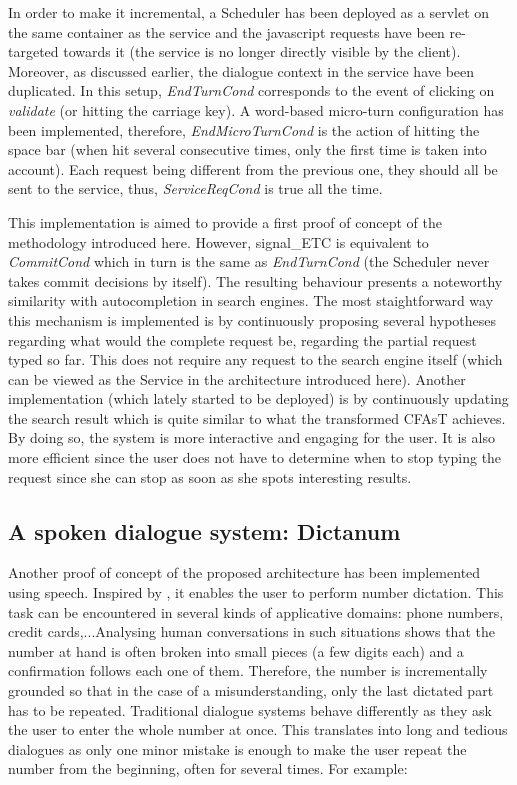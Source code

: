         In order to make it incremental, a Scheduler has been deployed as a servlet on the same container as the service and the javascript requests have been re-targeted towards it (the service is no longer directly visible by the client). Moreover, as discussed earlier, the dialogue context in the service have been duplicated. In this setup, \textit{EndTurnCond} corresponds to the event of clicking on \textit{validate} (or hitting the carriage key). A word-based micro-turn configuration has been implemented, therefore, \textit{EndMicroTurnCond} is the action of hitting the space bar (when hit several consecutive times, only the first time is taken into account). Each request being different from the previous one, they should all be sent to the service, thus, \textit{ServiceReqCond} is true all the time.
        
        This implementation is aimed to provide a first proof of concept of the methodology introduced here. However, signal\_ETC is equivalent to \textit{CommitCond} which in turn is the same as \textit{EndTurnCond} (the Scheduler never takes commit decisions by itself). The resulting behaviour presents a noteworthy similarity with autocompletion in search engines. The most staightforward way this mechanism is implemented is by continuously proposing several hypotheses regarding what would the complete request be, regarding the partial request typed so far. This does not require any request to the search engine itself (which can be viewed as the Service in the architecture introduced here). Another implementation (which lately started to be deployed) is by continuously updating the search result which is quite similar to what the transformed CFAsT achieves. By doing so, the system is more interactive and engaging for the user. It is also more efficient since the user does not have to determine when to stop typing the request since she can stop as soon as she spots interesting results.
    
    \subsection{A spoken dialogue system: Dictanum}
    
    	Another proof of concept of the proposed architecture has been implemented using speech. Inspired by \cite{Skantze2009}, it enables the user to perform number dictation. This task can be encountered in several kinds of applicative domains: phone numbers, credit cards,...Analysing human conversations in such situations shows that the number at hand is often broken into small pieces (a few digits each) and a confirmation follows each one of them. Therefore, the number is incrementally grounded so that in the case of a misunderstanding, only the last dictated part has to be repeated. Traditional dialogue systems behave differently as they ask the user to enter the whole number at once. This translates into long and tedious dialogues as only one minor mistake is enough to make the user repeat the number from the beginning, often for several times. For example:
        
